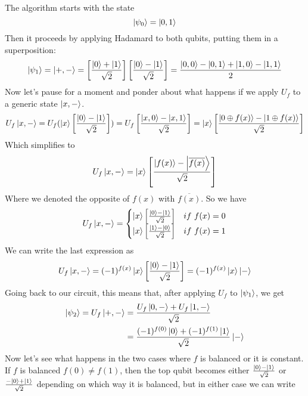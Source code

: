 \documentclass[12pt,a4paper]{report}
\theoremstyle{definition}
\theoremstyle{definition}
\theoremstyle{definition}
\begin{document}
The algorithm starts with the state
\begin{equation*}
    \ket{\psi_0} = \ket{0, 1}
\end{equation*}
Then it proceeds by applying Hadamard to both qubits, putting them in a superposition:
\begin{equation*}
    \ket{\psi_1} = \ket{+,-} = \left[\frac{\ket{0}+\ket{1}}{\sqrt{2}}\right]\left[\frac{\ket{0}-\ket{1}}{\sqrt{2}}\right]=\frac{\ket{0,0}-\ket{0,1}+\ket{1,0}-\ket{1,1}}{2}
\end{equation*}
Now let's pause for a moment and ponder about what happens if we apply $U_f$ to a generic state $\ket{x, -}$.
\begin{equation*}
    U_f\ket{x,-}=U_f(\ket{x}\left[\frac{\ket{0}-\ket{1}}{\sqrt{2}}\right])=U_f\left[\frac{\ket{x,0}-\ket{x,1}}{\sqrt{2}}\right]=\ket{x}\left[\frac{\ket{0 \oplus f(x)}-\ket{1 \oplus f(x)}}{\sqrt{2}}\right]
\end{equation*}
Which simplifies to
\begin{equation*}
    U_f\ket{x,-}=\ket{x}\left[\frac{\ket{f(x)}-\ket{\overline{f(x)}}}{\sqrt{2}}\right]
\end{equation*}
Where we denoted the opposite of $f(x)$ with $\overline{f(x)}$. So we have
\begin{equation*}
    U_f\ket{x,-}=\begin{cases}
        \ket{x}\left[\frac{\ket{0}-\ket{1}}{\sqrt{2}}\right] & if\ f(x) = 0\\
        \ket{x}\left[\frac{\ket{1}-\ket{0}}{\sqrt{2}}\right] & if\ f(x) = 1\\
    \end{cases}
\end{equation*}
We can write the last expression as
\begin{equation*}
    U_f\ket{x,-}=(-1)^{f(x)}\ket{x}\left[\frac{\ket{0}-\ket{1}}{\sqrt{2}}\right]=(-1)^{f(x)}\ket{x}\ket{-}
\end{equation*}
Going back to our circuit, this means that, after applying $U_f$ to $\ket{\psi_1}$, we get
\begin{align*}
    \ket{\psi_2}=U_f\ket{+,-}&=\frac{U_f\ket{0,-}+U_f\ket{1,-}}{\sqrt{2}}\\
    &=\frac{(-1)^{f(0)}\ket{0}+(-1)^{f(1)}\ket{1}}{\sqrt{2}}\ket{-}
\end{align*}
Now let's see what happens in the two cases where $f$ is balanced or it is constant.
If $f$ is balanced $f(0)\neq f(1)$, then the top qubit becomes either $\frac{\ket{0}-\ket{1}}{\sqrt{2}}$ or $\frac{-\ket{0}+\ket{1}}{\sqrt{2}}$ depending on which way it is balanced, but in either case we can write
\end{document}
